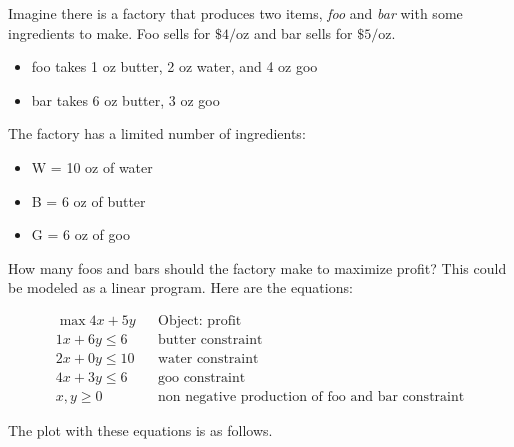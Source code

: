 \documentclass[12pt]{article}
\begin{document}
\begin{example}
    Imagine there is a factory that produces two items, \emph{foo} and \emph{bar} with some ingredients to make. Foo sells for $\$4 / \text{oz}$ and bar sells for $\$5 / \text{oz}$.
    \begin{itemize}
        \item foo takes 1 oz butter, 2  oz water, and 4 oz goo
        \item bar takes 6 oz butter, 3 oz goo
    \end{itemize}
    The factory has a limited number of ingredients:
    \begin{itemize}
        \item W = 10 oz of water
        \item B = 6 oz of butter
        \item G = 6 oz of goo
    \end{itemize}
    How many foos and bars should the factory make to maximize profit? This could be modeled as a linear program. Here are the equations:

    \begin{align}
        \max 4x + 5y   &  & \text{Object: profit}                                    \\
        1x + 6y \le 6  &  & \text{butter constraint}                                 \\
        2x + 0y \le 10 &  & \text{water constraint}                                  \\
        4x + 3y \le 6  &  & \text{goo constraint}                                    \\
        x, y \ge 0     &  & \text{non negative production of foo and bar constraint}
    \end{align}

    The plot with these equations is as follows.
    \begin{center}
\end{center}
\end{example}
\end{document}
